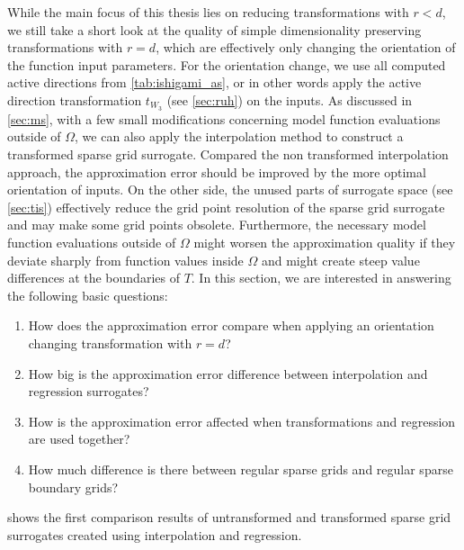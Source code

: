 \documentclass[
  a4paper,  %
  twoside,  %
  bibliography=totoc,
  headsepline,
  cleardoublepage=empty,
  parskip=half,
  draft=false
]{scrbook}
\begin{document}
While the main focus of this thesis lies on reducing transformations with $r < d$, we still take a short look at the quality of simple dimensionality preserving transformations with $r=d$, which are effectively only changing the orientation of the function input parameters.
For the orientation change, we use all computed active directions from \cref{tab:ishigami_as}, or in other words apply the active direction transformation $t_{W_3}$ (see \cref{sec:ruh}) on the inputs.
As discussed in \cref{sec:ms}, with a few small modifications concerning model function evaluations outside of $\Omega$, we can also apply the interpolation method to construct a transformed sparse grid surrogate.
Compared the non transformed interpolation approach, the approximation error should be improved by the more optimal orientation of inputs.
On the other side, the unused parts of surrogate space (see \cref{sec:tis}) effectively reduce the grid point resolution of the sparse grid surrogate and may make some grid points obsolete.
Furthermore, the necessary model function evaluations outside of $\Omega$ might worsen the approximation quality if they deviate sharply from function values inside $\Omega$ and might create steep value differences at the boundaries of $T$.
In this section, we are interested in answering the following basic questions:
\begin{enumerate}
\item How does the approximation error compare when applying an orientation changing transformation with $r=d$?
\item How big is the approximation error difference between interpolation and regression surrogates?
\item How is the approximation error affected when transformations and regression are used together?
\item How much difference is there between regular sparse grids and regular sparse boundary grids?
\end{enumerate}
 shows the first comparison results of untransformed and transformed sparse grid surrogates created using interpolation and regression.
\end{document}
